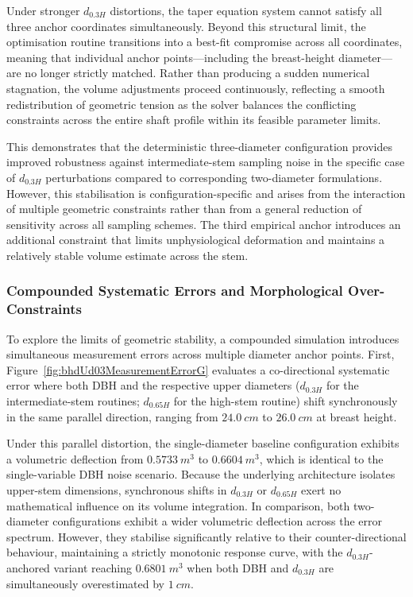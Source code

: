 \documentclass[twocolumn, bibliography=totoc]{scrartcl}
\begin{document}
Under stronger $d_{0.3H}$ distortions, the taper equation system cannot satisfy all three anchor coordinates simultaneously. Beyond this structural limit, the optimisation routine transitions into a best-fit compromise across all coordinates, meaning that individual anchor points—including the breast-height diameter—are no longer strictly matched. Rather than producing a sudden numerical stagnation, the volume adjustments proceed continuously, reflecting a smooth redistribution of geometric tension as the solver balances the conflicting constraints across the entire shaft profile within its feasible parameter limits.

This demonstrates that the deterministic three-diameter configuration provides improved robustness against intermediate-stem sampling noise in the specific case of $d_{0.3H}$ perturbations compared to corresponding two-diameter formulations. However, this stabilisation is configuration-specific and arises from the interaction of multiple geometric constraints rather than from a general reduction of sensitivity across all sampling schemes. The third empirical anchor introduces an additional constraint that limits unphysiological deformation and maintains a relatively stable volume estimate across the stem.

\subsubsection{Compounded Systematic Errors and Morphological Over-Constraints}

To explore the limits of geometric stability, a compounded simulation introduces simultaneous measurement errors across multiple diameter anchor points. First, Figure~\ref{fig:bhdUd03MeasurementErrorG} evaluates a co-directional systematic error where both DBH and the respective upper diameters ($d_{0.3H}$ for the intermediate-stem routines; $d_{0.65H}$ for the high-stem routine) shift synchronously in the same parallel direction, ranging from $\qty{24.0}{cm}$ to $\qty{26.0}{cm}$ at breast height.

Under this parallel distortion, the single-diameter baseline configuration exhibits a volumetric deflection from $\qty{0.5733}{m^3}$ to $\qty{0.6604}{m^3}$, which is identical to the single-variable DBH noise scenario. Because the underlying architecture isolates upper-stem dimensions, synchronous shifts in $d_{0.3H}$ or $d_{0.65H}$ exert no mathematical influence on its volume integration. In comparison, both two-diameter configurations exhibit a wider volumetric deflection across the error spectrum. However, they stabilise significantly relative to their counter-directional behaviour, maintaining a strictly monotonic response curve, with the $d_{0.3H}$-anchored variant reaching $\qty{0.6801}{m^3}$ when both DBH and $d_{0.3H}$ are simultaneously overestimated by $\qty{1}{cm}$.
\end{document}
